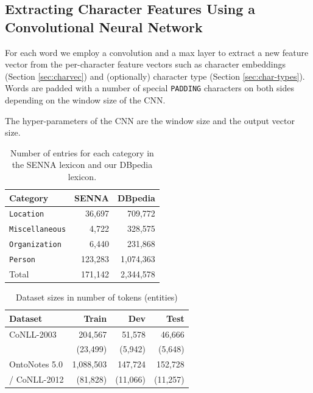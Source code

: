 \documentclass[11pt,letterpaper]{article}
\begin{document}
\hspace{-20mm}

\subsection{Extracting Character Features Using a Convolutional Neural Network}

For each word we employ a convolution and a max layer to extract a new feature vector from the per-character feature vectors such as character embeddings (Section \ref{sec:charvec}) and (optionally) character type (Section \ref{sec:char-types}). Words are padded with a number of special {\tt PADDING} characters on both sides depending on the window size of the CNN. 

The hyper-parameters of the CNN are the window size and the output vector size.

\begin{table}[t]
\begin{center}
\begin{tabular}{|l|r|r|}
\hline \bf Category & \bf SENNA & \bf DBpedia \\ \hline
{\tt Location} & 36,697 & 709,772 \\
{\tt Miscellaneous} & 4,722 & 328,575 \\
{\tt Organization} & 6,440 & 231,868 \\
{\tt Person} & 123,283 & 1,074,363 \\ \hline
Total & 171,142 & 2,344,578 \\
\hline
\end{tabular}
\end{center}
\caption{Number of entries for each category in the SENNA lexicon and our DBpedia lexicon.}
\label{tab:lexicon}
\end{table}


\begin{table}[t]
\begin{center}
\small
\begin{tabular}{|l|r|r|r|}
\hline \bf Dataset & \bf Train & \bf Dev & \bf Test \\ \hline
CoNLL-2003 & 204,567 & 51,578 & 46,666\\
& (23,499) & (5,942) & (5,648)\\ \hline
OntoNotes 5.0 & 1,088,503 & 147,724 & 152,728\\
 / CoNLL-2012 & (81,828) & (11,066) & (11,257)\\
\hline
\end{tabular}
\end{center}
\caption{Dataset sizes in number of tokens (entities)}
\label{tab:dataset}
\end{table} 
\end{document}

